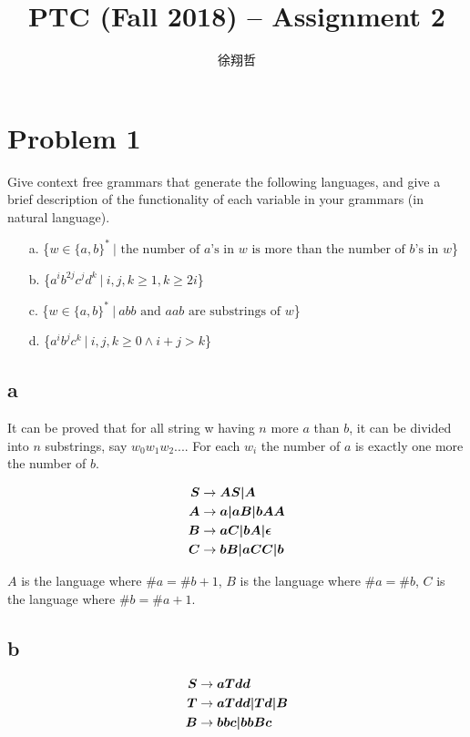 \documentclass[a4paper,UTF8]{ctexart}
\theoremstyle{definition}
\begin{document}
 
\title{PTC (Fall 2018) -- Assignment 2}
\author{徐翔哲}
\maketitle
\newpage

\section*{Problem 1}
Give context free grammars that generate the following languages, and give a brief description of the functionality of each variable in your grammars (in natural language).
\begin{enumerate}
	\item[a.] \{$w\in \{a,b\}^*\ |\mbox{ the number of $a$'s in $w$ is more than the number of $b$'s in $w$}$\}
	\item[b.] \{$a^ib^{2j}c^{j}d^{k}\ |\ i,j,k\geq 1, k \geq 2i$\}
	\item[c.] \{$w\in \{a,b\}^*\ |\ abb\mbox{ and }aab\mbox{ are substrings of }w$\}
	\item[d.] \{$a^{i}b^{j}c^{k}\ |\ i,j,k\geq 0 \wedge i + j > k$\}
\end{enumerate}

\subsection*{a}
It can be proved that for all string w having $n$ more $a$ than $b$,
it can be divided into $n$ substrings, say $w_0w_1w_2...$. For  each $w_i$
the number of $a$ is exactly one more the number of $b$.

\begin{alignat*}{2}
	\boldsymbol{S} &\rightarrow \boldsymbol{AS|A}           \\
	\boldsymbol{A} &\rightarrow \boldsymbol{a|aB|bAA}       \\
	\boldsymbol{B} &\rightarrow \boldsymbol{aC|bA|\epsilon} \\
	\boldsymbol{C} &\rightarrow \boldsymbol{bB|aCC|b}
\end{alignat*}

$A$ is the language where $\#a=\#b+1$, $B$ is the language where $\#a=\#b$, $C$ is the language where $\#b=\#a+1$.

\subsection*{b}
\begin{alignat*}{2}
	\boldsymbol{S} &\rightarrow \boldsymbol{aTdd}      \\
	\boldsymbol{T} &\rightarrow \boldsymbol{aTdd|Td|B} \\
	\boldsymbol{B} &\rightarrow \boldsymbol{bbc|bbBc}
\end{alignat*}
\end{document}
